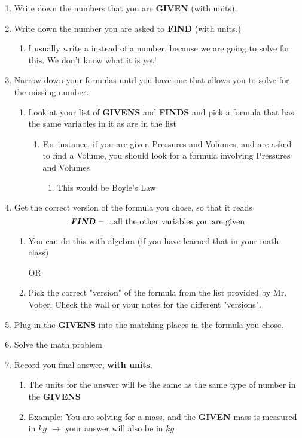 \documentclass[../../main.tex]{subfiles}
\begin{document}
 \begin{enumerate}
	\item Write down the numbers that you are \textbf{GIVEN} (with units).
	\item Write down the number you are asked to \textbf{FIND} (with units.)
	      \begin{enumerate}
		      \item I usually write a {\huge\textbf{}} instead of a number, because we are going to solve for this.  We don't know what it is yet!
	      \end{enumerate}
	\item Narrow down your formulas until you have one that allows you to solve for the missing number.
	      \begin{enumerate}
		      \item Look at your list of \textbf{GIVENS} and \textbf{FINDS} and pick a formula that has the same variables in it as are in the list
		            \begin{enumerate}
			            \item For instance, if you are given Pressures and Volumes, and are asked to find a Volume, you should look for a formula involving Pressures and Volumes
			                  \begin{enumerate}
				                  \item This would be Boyle's Law
			                  \end{enumerate}
		            \end{enumerate}
	      \end{enumerate}
	\item Get the correct version of the formula you chose, so that it reads \[\textbf{\emph{FIND}} = ...\text{all the other variables you are given}\]
	      \begin{enumerate}
		      \item You can do this with algebra (if you have learned that in your math class)

		            OR

		      \item Pick the correct "version" of the formula from the list provided by Mr. Vober.  Check the wall or your notes for the different "versions".
	      \end{enumerate}
	\item Plug in the \textbf{GIVENS} into the matching places in the formula you chose.
	\item Solve the math problem
	\item Record you final answer, \textbf{with units}.
	\begin{enumerate}
		\item The units for the answer will be the same as the same type of number in the \textbf{GIVENS}
		\item Example: You are solving for a mass, and the \textbf{GIVEN} mass is measured in $kg$ $\rightarrow$ your answer will also be in $kg$
	\end{enumerate}
\end{enumerate}
\end{document}
